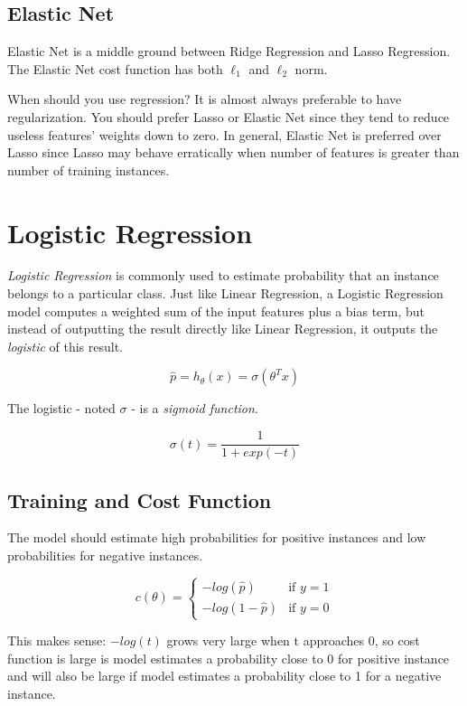 \documentclass[letterpaper]{article}
\begin{document}
\subsection{Elastic Net}
Elastic Net is a middle ground between Ridge Regression and Lasso Regression. The Elastic Net cost function has both $\ell_{1}$ and $\ell_{2}$ norm. 

When should you use regression? It is almost always preferable to have regularization. You should prefer Lasso or Elastic Net since they tend to reduce useless features' weights down to zero. In general, Elastic Net is preferred over Lasso since Lasso may behave erratically when number of features is greater than number of training instances. 

\section{Logistic Regression}
\textsl{Logistic Regression} is commonly used to estimate probability that an instance belongs to a particular class. Just like Linear Regression, a Logistic Regression model computes a weighted sum of the input features plus a bias term, but instead of outputting the result directly like Linear Regression, it outputs the \textsl{logistic} of this result. 

$$ \hat{p} = h_{\theta}(x) = \sigma (\theta^{T}x) $$

The logistic - noted $\sigma$ - is a \textsl{sigmoid function}. 

$$ \sigma(t) = \frac{1}{1 + exp(-t)} $$

\newpage
\subsection{Training and Cost Function}
The model should estimate high probabilities for positive instances and low probabilities for negative instances. 

$$ c(\theta) = \begin{cases} 
-log(\hat{p}) & \text{if } y = 1 \\
-log(1 - \hat{p}) & \text{if } y = 0
\end{cases}
$$

This makes sense: $-log(t)$ grows very large when t approaches 0, so cost function is large is model estimates a probability close to 0 for positive instance and will also be large if model estimates a probability close to 1 for a negative instance. 
\end{document}
